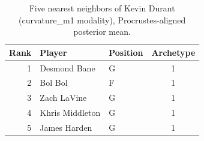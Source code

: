 \begin{table}[htbp]
  \centering\small
  \begin{tabular}{rllc}
    \toprule
    Rank & Player & Position & Archetype \\
    \midrule
    1 & Desmond Bane & G & 1 \\
    2 & Bol Bol & F & 1 \\
    3 & Zach LaVine & G & 1 \\
    4 & Khris Middleton & G & 1 \\
    5 & James Harden & G & 1 \\
    \bottomrule
  \end{tabular}
  \caption{Five nearest neighbors of Kevin Durant (curvature_m1 modality), Procrustes-aligned posterior mean.}
  \label{tab:Kevin_Durant_neighbors_curvature_m1}
\end{table}

